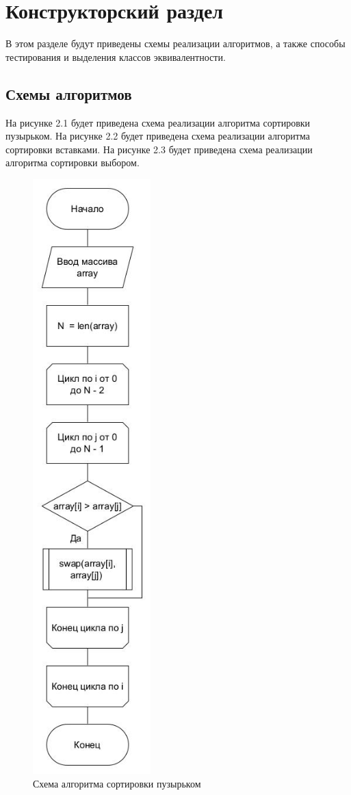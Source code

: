 \chapter{Конструкторский раздел}
В этом разделе будут приведены схемы реализации алгоритмов, 
а также способы тестирования и выделения классов эквивалентности.

\section{Схемы алгоритмов}
На рисунке 2.1 будет приведена схема реализации алгоритма сортировки пузырьком.
На рисунке 2.2 будет приведена схема реализации алгоритма сортировки вставками.
На рисунке 2.3 будет приведена схема реализации алгоритма сортировки выбором.

\begin{figure}[hp]
	\begin{center}
		\includegraphics[height=23cm]{graph/bubble.jpg}
	\end{center}
	\caption{Схема алгоритма сортировки пузырьком}
\end{figure}

